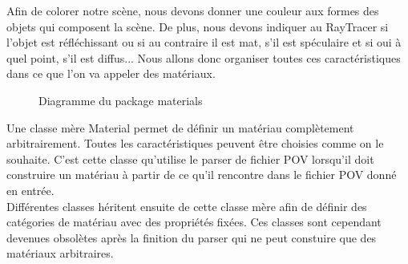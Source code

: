 \documentclass[../../Rapport RayTracer.tex]{subfiles}
\begin{document}
Afin de colorer notre scène, nous devons donner une couleur aux formes des objets qui composent la scène. De plus, nous devons indiquer au RayTracer si l'objet est réfléchissant ou si au contraire il est mat, s'il est spéculaire et si oui à quel point, s'il est diffus...
Nous allons donc organiser toutes ces caractéristiques dans ce que l'on va appeler des matériaux.

\begin{figure}[h!]
	
	\caption{Diagramme du package materials}
	\label{diagrammePackageMaterials}
\end{figure}
\FloatBarrier

Une classe mère Material permet de définir un matériau complètement arbitrairement. Toutes les caractéristiques peuvent être choisies comme on le souhaite. C'est cette classe qu'utilise le parser de fichier POV lorsqu'il doit construire un matériau à partir de ce qu'il rencontre dans le fichier POV donné en entrée.\\
Différentes classes héritent ensuite de cette classe mère afin de définir des catégories de matériau avec des propriétés fixées. Ces classes sont cependant devenues obsolètes après la finition du parser qui ne peut constuire que des matériaux arbitraires.
\end{document}
